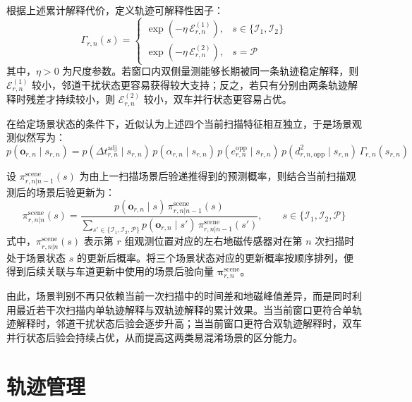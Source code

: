 \documentclass{xdupgthesis}
\begin{document}
根据上述累计解释代价，定义轨迹可解释性因子：
\begin{equation}
	\Gamma_{r,n}(s)
	=
	\begin{cases}
		\exp\!\left(-\eta\,\mathcal E_{r,n}^{(1)}\right),
		& s\in\{\mathcal I_1,\mathcal I_2\}\\[4pt]
		\exp\!\left(-\eta\,\mathcal E_{r,n}^{(2)}\right),
		& s=\mathcal P
	\end{cases}
\end{equation}
其中，$\eta>0$ 为尺度参数。若窗口内双侧量测能够长期被同一条轨迹稳定解释，则 $\mathcal E_{r,n}^{(1)}$ 较小，邻道干扰状态更容易获得较大支持；反之，若只有分别由两条轨迹解释时残差才持续较小，则 $\mathcal E_{r,n}^{(2)}$ 较小，双车并行状态更容易占优。

在给定场景状态的条件下，近似认为上述四个当前扫描特征相互独立，于是场景观测似然写为：
\begin{equation}
	p(\mathbf o_{r,n}\mid s_{r,n})
	=
	p(\Delta t_{r,n}^{\mathrm{adj}}\mid s_{r,n})\,
	p(\alpha_{r,n}\mid s_{r,n})\,
	p(e_{r,n}^{\mathrm{opp}}\mid s_{r,n})\,
	p(d_{r,n,\mathrm{opp}}^2\mid s_{r,n})\,
	\Gamma_{r,n}(s_{r,n})
\end{equation}

设 $\pi_{r,n|n-1}^{\mathrm{scene}}(s)$ 为由上一扫描场景后验递推得到的预测概率，则结合当前扫描观测后的场景后验更新为：
\begin{equation}
	\pi_{r,n|n}^{\mathrm{scene}}(s)
	=
	\frac{
		p(\mathbf o_{r,n}\mid s)\,
		\pi_{r,n|n-1}^{\mathrm{scene}}(s)
	}{
		\sum\limits_{s'\in\{\mathcal I_1,\mathcal I_2,\mathcal P\}}
		p(\mathbf o_{r,n}\mid s')\,
		\pi_{r,n|n-1}^{\mathrm{scene}}(s')
	},
	\qquad
	s\in\{\mathcal I_1,\mathcal I_2,\mathcal P\}
\end{equation}
式中，$\pi_{r,n|n}^{\mathrm{scene}}(s)$ 表示第 $r$ 组观测位置对应的左右地磁传感器对在第 $n$ 次扫描时处于场景状态 $s$ 的更新后概率。将三个场景状态对应的更新概率按顺序排列，便得到后续关联与车道更新中使用的场景后验向量 $\boldsymbol\pi_{r,n}^{\mathrm{scene}}$。

由此，场景判别不再只依赖当前一次扫描中的时间差和地磁峰值差异，而是同时利用最近若干次扫描内单轨迹解释与双轨迹解释的累计效果。当当前窗口更符合单轨迹解释时，邻道干扰状态后验会逐步升高；当当前窗口更符合双轨迹解释时，双车并行状态后验会持续占优，从而提高这两类易混淆场景的区分能力。



\section{轨迹管理}
\label{sec:ch3_track_management}
\end{document}
